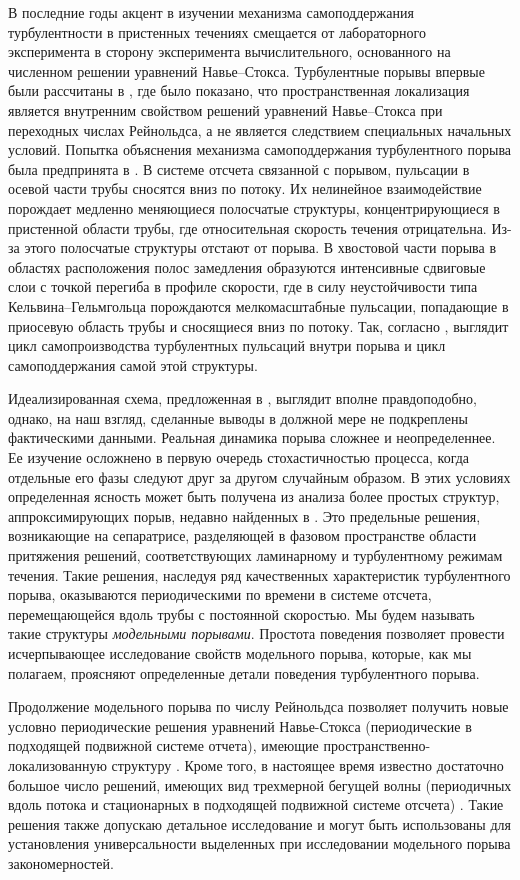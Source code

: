 В последние годы акцент в изучении механизма самоподдержания турбулентности в пристенных течениях смещается от лабораторного эксперимента в сторону эксперимента вычислительного, основанного на численном решении уравнений Навье--Стокса. Турбулентные порывы впервые были рассчитаны в \cite{Priymak2004}, где было показано, что пространственная локализация является внутренним свойством решений уравнений Навье--Стокса при переходных числах Рейнольдса, а не является следствием специальных начальных условий. Попытка объяснения механизма самоподдержания турбулентного порыва была предпринята в \cite{Shimizu2009}. В системе отсчета связанной с порывом, пульсации в осевой части трубы сносятся вниз по потоку. Их нелинейное взаимодействие порождает медленно меняющиеся полосчатые структуры, концентрирующиеся в пристенной области трубы, где относительная скорость течения отрицательна. Из-за этого полосчатые структуры отстают от порыва. В хвостовой части порыва в областях расположения полос замедления образуются интенсивные сдвиговые слои с точкой перегиба в профиле скорости, где в силу неустойчивости типа Кельвина--Гельмгольца порождаются мелкомасштабные пульсации, попадающие в приосевую область трубы и сносящиеся вниз по потоку. Так, согласно \cite{Shimizu2009}, выглядит цикл самопроизводства турбулентных пульсаций внутри порыва и цикл самоподдержания самой этой структуры.

Идеализированная схема, предложенная в \cite{Shimizu2009}, выглядит вполне правдоподобно, однако, на наш взгляд, сделанные выводы в должной мере не подкреплены фактическими данными. Реальная динамика порыва сложнее и неопределеннее. Ее изучение осложнено в первую очередь стохастичностью процесса, когда отдельные его фазы следуют друг за другом случайным образом. В этих условиях определенная ясность может быть получена из анализа более простых структур, аппроксимирующих порыв, недавно найденных в \cite{Skufca2006, Avila2013}. Это предельные решения, возникающие на сепаратрисе, разделяющей в фазовом пространстве области притяжения решений, соответствующих ламинарному и турбулентному режимам течения. Такие решения, наследуя ряд качественных характеристик турбулентного порыва, оказываются периодическими по времени в системе отсчета, перемещающейся вдоль трубы с постоянной скоростью. Мы будем называть такие структуры {\it модельными порывами}. Простота поведения позволяет провести исчерпывающее исследование свойств модельного порыва, которые, как мы полагаем, проясняют определенные детали поведения турбулентного порыва. 

Продолжение модельного порыва по числу Рейнольдса позволяет получить новые условно периодические решения уравнений Навье-Стокса (периодические в подходящей подвижной системе отчета), имеющие пространственно-локализованную структуру \cite{Avila2013}. Кроме того, в настоящее время известно достаточно большое число решений, имеющих вид трехмерной бегущей волны (периодичных вдоль потока и стационарных в подходящей подвижной системе отсчета) \cite{Kawahara2012}. Такие решения также допускаю детальное исследование и могут быть использованы для установления универсальности выделенных при исследовании модельного порыва закономерностей. 

